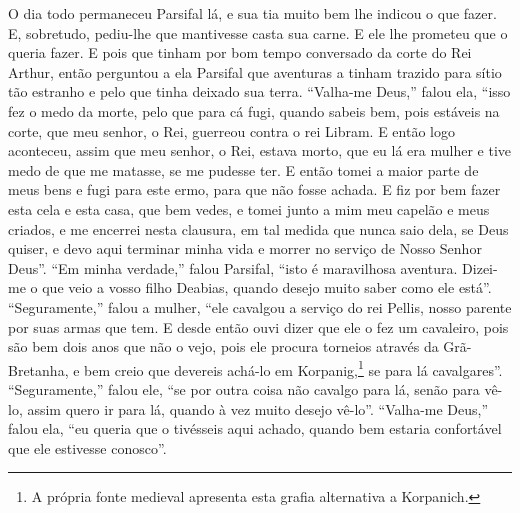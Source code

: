 O dia todo permaneceu Parsifal lá, e sua tia muito bem lhe indicou o que
fazer. E, sobretudo, pediu-lhe que mantivesse casta sua carne. E ele lhe
prometeu que o queria fazer. E pois que tinham por bom tempo conversado da
corte do Rei Arthur, então perguntou a ela Parsifal que aventuras a tinham
trazido para sítio tão estranho e pelo que tinha deixado sua terra. “Valha-me
Deus,” falou ela, “isso fez o medo da morte, pelo que para cá fugi, quando
sabeis bem, pois estáveis na corte, que meu senhor, o Rei, guerreou contra o
rei Libram. E então logo aconteceu, assim que meu senhor, o Rei, estava morto,
que eu lá era mulher e tive medo de que me matasse, se me pudesse ter. E então
tomei a maior parte de meus bens e fugi para este ermo, para que não fosse
achada. E fiz por bem fazer esta cela e esta casa, que bem vedes, e tomei junto
a mim meu capelão e meus criados, e me encerrei nesta clausura, em tal medida
que nunca saio dela, se Deus quiser, e devo aqui terminar minha vida e morrer
no serviço de Nosso Senhor Deus”. “Em minha verdade,” falou Parsifal, ``isto é
maravilhosa aventura. Dizei-me o que veio a vosso filho Deabias, quando desejo
muito saber como ele está”. “Seguramente,” falou a mulher, “ele cavalgou a
serviço do rei Pellis, nosso parente por suas armas que tem. E desde então ouvi
dizer que ele o fez um cavaleiro, pois são bem dois anos que não o vejo, pois
ele procura torneios através da Grã-Bretanha, e bem creio que devereis achá-lo
em Korpanig,\footnote{ A própria fonte medieval apresenta esta grafia
alternativa a Korpanich.}  se para lá cavalgares”. “Seguramente,”
falou ele, ``se por outra coisa não cavalgo para lá, senão para vê-lo, assim
quero ir para lá, quando à vez muito desejo vê-lo”. “Valha-me Deus,” falou ela,
“eu queria que o tivésseis aqui achado, quando bem estaria confortável que ele
estivesse conosco”. 

